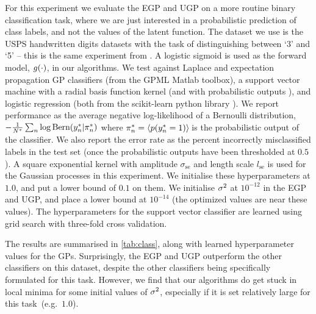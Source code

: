 \documentclass{article} %
\begin{document}
For this experiment we evaluate the EGP and UGP on a more routine binary
classification task, where we are just interested in a probabilistic prediction
of class labels, and not the values of the latent function. The dataset we use
is the USPS handwritten digits datasets with the task of distinguishing between
`3' and `5' -- this is the same experiment from \cite{Rasmussen2006}. A
logistic sigmoid is used as the forward model, $g\!\left({{\cdot}}\right)$, in our
algorithms. We test against Laplace and expectation propagation GP classifiers
(from the GPML Matlab toolbox), a support vector machine with a radial basis
function kernel (and with probabilistic outputs \cite{Platt1999}), and logistic
regression (both from the scikit-learn python library \cite{scikit-learn}).
We report performance as the average negative log-likelihood of a Bernoulli
distribution, $-\frac{1}{N^{*}} \sum_n \log \textrm{Bern}\!\left({y_n^{*}}\middle\vert{\pi\ensuremath{^{*}}_n}\right)$
where $\pi^{*}_n = \left\langle{\ensuremath{p\!\left({y^{*}_n = 1}\right)}}\right\rangle_{\!{}}$ is the probabilistic
output of the classifier. We also report the error rate as the percent
incorrectly misclassified labels in the test set (once the probabilistic
outputs have been thresholded at $0.5$). A square exponential kernel with
amplitude $\sigma_\text{se}$ and length scale $l_\text{se}$ is used for the
Gaussian processes in this experiment. We initialise these hyperparameters at
$1.0$, and put a lower bound of $0.1$ on them. We initialise $\sigma^2$ at
$10^{-12}$ in the EGP and UGP, and place a lower bound at $10^{-14}$ (the
optimized values are near these values). The hyperparameters for the support
vector classifier are learned using grid search with three-fold cross
validation. 

The results are summarised in \autoref{tab:class}, along with learned
hyperparameter values for the GPs. Surprisingly, the EGP and UGP outperform the
other classifiers on this dataset, despite the other classifiers being
specifically formulated for this task. However, we find that our algorithms do
get stuck in local minima for some initial values of $\sigma^2$, especially if it
is set relatively large for this task~(e.g.~$1.0$).
\end{document}

